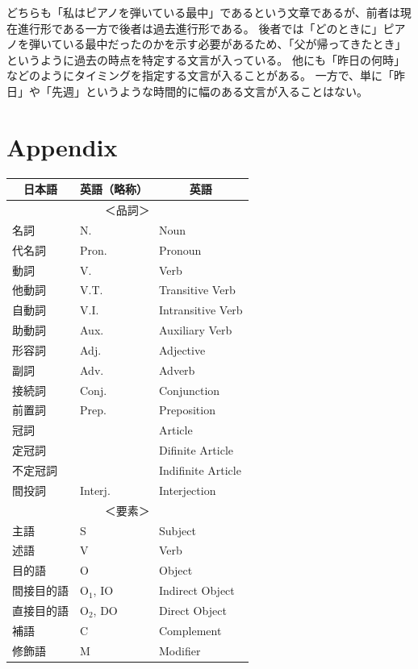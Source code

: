 \documentclass[11pt,a4paper,titlepage]{jsarticle}
\begin{document}
どちらも「私はピアノを弾いている最中」であるという文章であるが、前者は現在進行形である一方で後者は過去進行形である。
後者では「どのときに」ピアノを弾いている最中だったのかを示す必要があるため、「父が帰ってきたとき」というように過去の時点を特定する文言が入っている。
他にも「昨日の何時」などのようにタイミングを指定する文言が入ることがある。
一方で、単に「昨日」や「先週」というような時間的に幅のある文言が入ることはない。

\newpage

\section*{Appendix}

\begin{table}[h]
  \centering
  \begin{tabular}{lll}
    \hline
    \multicolumn{1}{c}{日本語} & \multicolumn{1}{c}{英語（略称）} & \multicolumn{1}{c}{英語}\\
    \hline \hline
    \multicolumn{3}{c}{＜品詞＞}\\
    名詞 & N. & Noun\\
    代名詞 & Pron. & Pronoun\\
    動詞 & V. & Verb\\
    他動詞 & V.T. & Transitive Verb\\
    自動詞 & V.I. & Intransitive Verb\\
    助動詞 & Aux. & Auxiliary Verb\\
    形容詞 & Adj. & Adjective\\
    副詞 & Adv. & Adverb\\
    接続詞 & Conj. & Conjunction\\
    前置詞 & Prep. & Preposition\\
    冠詞 & & Article\\
    定冠詞 & & Difinite Article\\
    不定冠詞 & & Indifinite Article\\
    間投詞 & Interj. & Interjection\\
    \hline
    \multicolumn{3}{c}{＜要素＞}\\
    主語 & S & Subject\\
    述語 & V & Verb\\
    目的語 & O & Object\\
    間接目的語 & $\text{O}_1$, IO & Indirect Object\\
    直接目的語 & $\text{O}_2$, DO & Direct Object\\
    補語 & C & Complement\\
    修飾語 & M & Modifier\\
    \hline
  \end{tabular}
\end{table}
\end{document}
